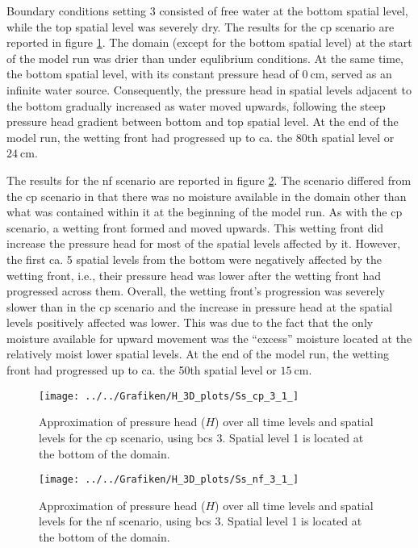 Boundary conditions setting 3 consisted of free water at the bottom spatial level, while the top spatial level was severely dry.  The results for the cp scenario are reported in figure \ref{fig:cp3}.  The domain (except for the bottom spatial level) at the start of the model run was drier than under equlibrium conditions.  At the same time, the bottom spatial level, with its constant pressure head of $\SI{0}{\centi\meter}$, served as an infinite water source.  Consequently, the pressure head in spatial levels adjacent to the bottom gradually increased as water moved upwards, following the steep pressure head gradient between bottom and top spatial level.  At the end of the model run, the wetting front had progressed up to ca. the 80th spatial level or $\SI{24}{\centi\meter}$.

The results for the nf scenario are reported in figure \ref{fig:nf3}.  The scenario differed from the cp scenario in that there was no moisture available in the domain other than what was contained within it at the beginning of the model run.  As with the cp scenario, a wetting front formed and moved upwards.  This wetting front did increase the pressure head for most of the spatial levels affected by it.  However, the first ca. 5 spatial levels from the bottom were negatively affected by the wetting front, i.e., their pressure head was lower after the wetting front had progressed across them.  Overall, the wetting front’s progression was severely slower than in the cp scenario and the increase in pressure head at the spatial levels positively affected was lower.  This was due to the fact that the only moisture available for upward movement was the ``excess'' moisture located at the relatively moist lower spatial levels.  At the end of the model run, the wetting front had progressed up to ca. the 50th spatial level or $\SI{15}{\centi\meter}$.

\begin{figure}[H]
  \centering
  \texttt{[image: ../../Grafiken/H\_3D\_plots/Ss\_cp\_3\_1\_]}
  \caption{Approximation of pressure head ($H$) over all time levels and spatial levels for the cp scenario, using bcs 3.  Spatial level 1 is located at the bottom of the domain.}
  \label{fig:cp3}
\end{figure}

\begin{figure}[H]
  \centering
  \texttt{[image: ../../Grafiken/H\_3D\_plots/Ss\_nf\_3\_1\_]}
  \caption{Approximation of pressure head ($H$) over all time levels and spatial levels for the nf scenario, using bcs 3.  Spatial level 1 is located at the bottom of the domain.}
  \label{fig:nf3}
\end{figure}

